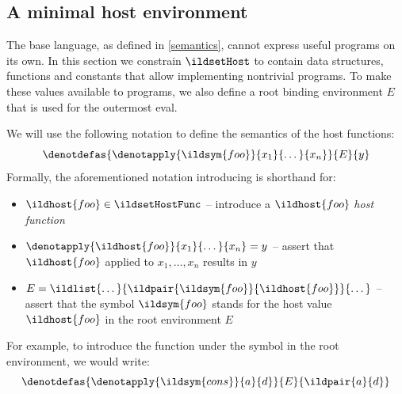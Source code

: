 \subsection{A minimal host environment}
\label{root-env}

The base language, as defined in \cref{semantics}, cannot express useful programs on its own. In this section we constrain
\(\ildsetHost\) to contain data structures, functions and constants that allow implementing nontrivial
programs. To make these values available to programs, we also define a root binding environment \(E\)
that is used for the outermost eval.

We will use the following notation
to define the semantics of the host functions:
\[ \denotdefas{\denotapply{\ildsym{foo}}{x_1}{\dots}{x_n}}{E}{y} \]
Formally, the aforementioned notation introducing  is shorthand for:
\begin{itemize}
  \item \(\ildhost{foo} \in \ildsetHostFunc\) -- introduce a \(\ildhost{foo}\) \emph{host function}
  \item \( \denotapply{\ildhost{foo}}{x_1}{\dots}{x_n} = y \) -- assert that \(\ildhost{foo}\) applied to \(x_1, \dots, x_n\) results in \( y \)
  \item \(E = \ildlist{\dots}{\ildpair{\ildsym{foo}}{\ildhost{foo}}}{\dots}\) -- assert that the symbol \(\ildsym{foo}\) stands for the host value \(\ildhost{foo}\) in the root environment \(E\)
\end{itemize}
For example, to introduce the function  under the symbol 
in the root environment, we would write:
\[ \denotdefas{\denotapply{\ildsym{cons}}{a}{d}}{E}{\ildpair{a}{d}} \]


